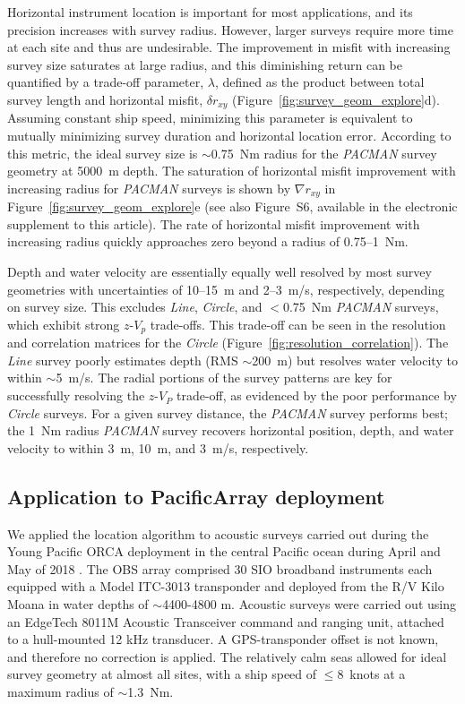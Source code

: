 Horizontal instrument location is important for most applications, and its precision increases with survey radius. However, larger surveys require more time at each site and thus are undesirable. The improvement in misfit with increasing survey size saturates at large radius, and this diminishing return can be quantified by a trade-off parameter, $\lambda$, defined as the product between total survey length and horizontal misfit, $\delta r_{xy}$ (Figure~\ref{fig:survey_geom_explore}d). Assuming constant ship speed, minimizing this parameter is equivalent to mutually minimizing survey duration and horizontal location error. According to this metric, the ideal survey size is $\sim$0.75~Nm radius for the \textit{PACMAN} survey geometry at 5000~m depth. The saturation of horizontal misfit improvement with increasing radius for \textit{PACMAN} surveys is shown by $\nabla r_{xy}$ in Figure~\ref{fig:survey_geom_explore}e (see also Figure~S6, available in the electronic supplement to this article). The rate of horizontal misfit improvement with increasing radius quickly approaches zero beyond a radius of 0.75--1~Nm.

Depth and water velocity are essentially equally well resolved by most survey geometries with uncertainties of 10--15~m and 2--3~m/s, respectively, depending on survey size. This excludes \textit{Line}, \textit{Circle}, and $<$0.75~Nm \textit{PACMAN} surveys, which exhibit strong $z$-$V_p$ trade-offs. This trade-off can be seen in the resolution and correlation matrices for the \textit{Circle} (Figure~\ref{fig:resolution_correlation}). The \textit{Line} survey poorly estimates depth (RMS $\sim$200~m) but resolves water velocity to within $\sim$5~m/s. The radial portions of the survey patterns are key for successfully resolving the $z$-$V_P$ trade-off, as evidenced by the poor performance by \textit{Circle} surveys. For a given survey distance, the \textit{PACMAN} survey performs best; the 1~Nm radius \textit{PACMAN} survey recovers horizontal position, depth, and water velocity to within 3~m, 10~m, and 3~m/s, respectively.


\subsection{Application to PacificArray deployment} \label{sec:PacificArray_deployment}
We applied the location algorithm to acoustic surveys carried out during the Young Pacific ORCA deployment in the central Pacific ocean during April and May of 2018 \citep{Gaherty2018}. The OBS array comprised 30 SIO broadband instruments each equipped with a Model ITC-3013 transponder and deployed from the R/V Kilo Moana in water depths of $\sim$4400-4800 m. Acoustic  surveys were carried out using an EdgeTech 8011M Acoustic Transceiver command and ranging unit, attached to a hull-mounted 12 kHz transducer. A GPS-transponder offset is not known, and therefore no correction is applied. The relatively calm seas allowed for ideal survey geometry at almost all sites, with a ship speed of \mbox{$\le$8~knots} at a maximum radius of \mbox{$\sim$1.3~Nm}. 

